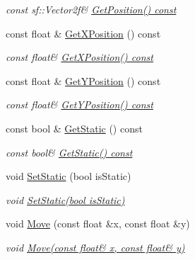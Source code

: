 \begin{DoxyCompactItemize}
\begin{DoxyCompactList}\small\item\em const sf\+::\+Vector2f\& \hyperlink{classrvl_1_1_box_collider_component_af3f0eb3154ab12ca6e2b99ed8a6b47b0}{Get\+Position() const} \end{DoxyCompactList}\item 
const float \& \hyperlink{classrvl_1_1_box_collider_component_a0fd7571e3de2e8cf01eb7149c5e507da}{Get\+X\+Position} () const
\begin{DoxyCompactList}\small\item\em const float\& \hyperlink{classrvl_1_1_box_collider_component_a0fd7571e3de2e8cf01eb7149c5e507da}{Get\+X\+Position() const} \end{DoxyCompactList}\item 
const float \& \hyperlink{classrvl_1_1_box_collider_component_ab21aca89c253235b2f33867c2b411467}{Get\+Y\+Position} () const
\begin{DoxyCompactList}\small\item\em const float\& \hyperlink{classrvl_1_1_box_collider_component_ab21aca89c253235b2f33867c2b411467}{Get\+Y\+Position() const} \end{DoxyCompactList}\item 
const bool \& \hyperlink{classrvl_1_1_box_collider_component_accc54a2c6d9472dd85f27876e0bacb18}{Get\+Static} () const
\begin{DoxyCompactList}\small\item\em const bool\& \hyperlink{classrvl_1_1_box_collider_component_accc54a2c6d9472dd85f27876e0bacb18}{Get\+Static() const} \end{DoxyCompactList}\item 
void \hyperlink{classrvl_1_1_box_collider_component_aaa7a7e7213f89532aa0b8a311ff264f8}{Set\+Static} (bool is\+Static)
\begin{DoxyCompactList}\small\item\em void \hyperlink{classrvl_1_1_box_collider_component_aaa7a7e7213f89532aa0b8a311ff264f8}{Set\+Static(bool is\+Static)} \end{DoxyCompactList}\item 
void \hyperlink{classrvl_1_1_box_collider_component_a97acd0965e4dd2bfd281e1ee5db78135}{Move} (const float \&x, const float \&y)
\begin{DoxyCompactList}\small\item\em void \hyperlink{classrvl_1_1_box_collider_component_a97acd0965e4dd2bfd281e1ee5db78135}{Move(const float\& x, const float\& y)} \end{DoxyCompactList}\end{DoxyCompactItemize}
